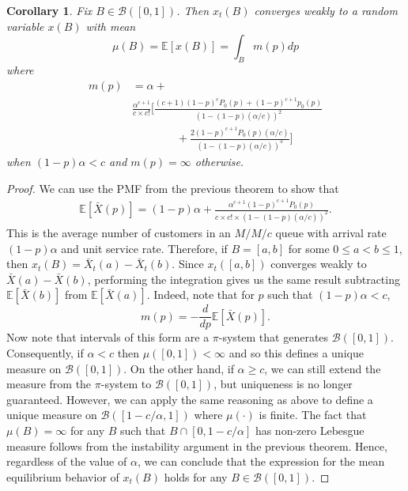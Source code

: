 \documentclass[conference]{IEEEtran}
\newtheorem{corollary}{Corollary}
\newcommand{\E}{\mathbb{E}}
\newcommand{\Bcal}{\mathcal{B}}
\begin{document}
\begin{corollary}
  \label{cor:x}
  Fix $B \in \Bcal([0, 1])$. Then $x_t(B)$ converges weakly to a
  random variable $x(B)$ with mean
  \begin{equation}
    \mu(B) = \E[x(B)] = \int_B m(p) dp
  \end{equation}
  where 
  \begin{align}
    m(p) &= \alpha +\\
    &\frac{\alpha^{c+1}}{c\times c!}\Bigg[%
    \frac{(c + 1)(1-p)^c P_0(p) + (1-p)^{c+1} p_0(p)}{(1 - (1-p)(\alpha/c))^2} \nonumber\\
    &\quad\quad\quad\quad+%
    \frac{2(1-p)^{c+1} P_0(p) (\alpha/c)}{(1 - (1-p)(\alpha/c))^3}\Bigg]\nonumber
  \end{align}
  when $(1-p)\alpha < c$ and $m(p) = \infty$ otherwise.
\end{corollary}
\begin{proof}
  We can use the PMF from the previous theorem to show that
  \begin{align}
    \E[\bar X(p)] = (1-p)\alpha + \frac{\alpha^{c+1} (1-p)^{c+1} P_0(p)}{c \times c! \times (1 - (1-p)(\alpha/c))^2}.
  \end{align}
  This is the average number of customers in an $M/M/c$ queue with
  arrival rate $(1-p)\alpha$ and unit service rate.  Therefore, if $B
  = [a, b]$ for some $0 \leq a < b \leq 1$, then $x_t(B) = \bar X_t(a)
  - \bar X_t(b)$. Since $x_t([a, b])$ converges weakly to $\bar X(a) -
  \bar X(b)$, performing the integration gives us the same result
  subtracting $\E[\bar X(b)]$ from $\E[\bar X(a)]$. Indeed, note that
  for $p$ such that $(1-p)\alpha < c$,
  \begin{equation}
    m(p) = -\frac{d}{dp} \E[\bar X(p)].
  \end{equation}
  Now note that intervals of this form are a $\pi$-system that
  generates $\Bcal([0, 1])$. Consequently, if $\alpha < c$ then
  $\mu([0,1]) < \infty$ and so this defines a unique measure on
  $\Bcal([0, 1])$. On the other hand, if $\alpha \geq c$, we can still
  extend the measure from the $\pi$-system to $\Bcal([0, 1])$, but
  uniqueness is no longer guaranteed. However, we can apply the same
  reasoning as above to define a unique measure on
  $\Bcal([1-c/\alpha,1])$ where $\mu(\cdot)$ is finite. The fact that
  $\mu(B) = \infty$ for any $B$ such that $B \cap [0,1 - c/\alpha]$
  has non-zero Lebesgue measure follows from the instability argument
  in the previous theorem.  Hence, regardless of the value of
  $\alpha$, we can conclude that the expression for the mean
  equilibrium behavior of $x_t(B)$ holds for any $B \in \Bcal([0,1])$.
\end{proof}
\end{document}
